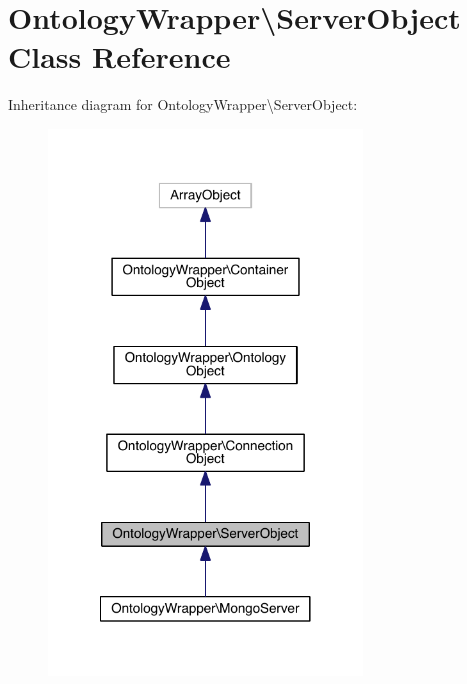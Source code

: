 \hypertarget{class_ontology_wrapper_1_1_server_object}{\section{Ontology\-Wrapper\textbackslash{}Server\-Object Class Reference}
\label{class_ontology_wrapper_1_1_server_object}
}


Inheritance diagram for Ontology\-Wrapper\textbackslash{}Server\-Object\-:
\nopagebreak
\begin{figure}[H]
\begin{center}
\leavevmode
\includegraphics[width=236pt]{class_ontology_wrapper_1_1_server_object__inherit__graph}
\end{center}
\end{figure}


